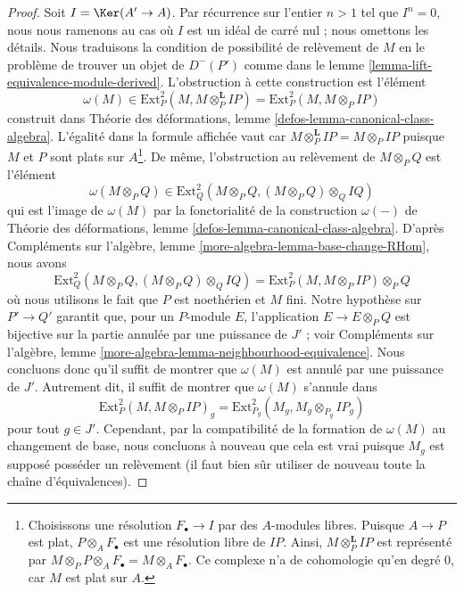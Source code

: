 \begin{proof}
Soit $I = \Ker(A' \to A)$. Par récurrence sur l'entier $n > 1$
tel que $I^n = 0$, nous nous ramenons au cas où $I$ est un idéal
de carré nul ; nous omettons les détails.
Nous traduisons la condition de possibilité de relèvement de
$M$ en le problème de trouver un objet de $D^-(P')$ comme dans le
lemme \ref{lemma-lift-equivalence-module-derived}.
L'obstruction à cette construction est l'élément
$$
\omega(M) \in \text{Ext}^2_P(M, M \otimes_P^\mathbf{L} IP) =
\text{Ext}^2_P(M, M \otimes_P IP)
$$
construit dans
Théorie des déformations, lemme \ref{defos-lemma-canonical-class-algebra}.
L'égalité dans la formule affichée vaut car
$M \otimes_P^\mathbf{L} IP = M \otimes_P IP$
puisque $M$ et $P$ sont plats sur $A$\footnote{Choisissons une résolution
$F_\bullet \to I$ par des $A$-modules libres. Puisque $A \to P$ est plat,
$P \otimes_A F_\bullet$ est une résolution libre de $IP$.
Ainsi, $M \otimes_P^\mathbf{L} IP$ est représenté par
$M \otimes_P P \otimes_A F_\bullet = M \otimes_A F_\bullet$.
Ce complexe n'a de cohomologie qu'en degré $0$, car $M$ est plat sur $A$.}.
De même, l'obstruction au relèvement de $M \otimes_P Q$ est
l'élément
$$
\omega(M \otimes_P Q) \in
\text{Ext}^2_Q(M \otimes_P Q, (M \otimes_P Q) \otimes_Q IQ)
$$
qui est l'image de $\omega(M)$ par la fonctorialité
de la construction $\omega(-)$ de
Théorie des déformations, lemme \ref{defos-lemma-canonical-class-algebra}.
D'après Compléments sur l'algèbre, lemme \ref{more-algebra-lemma-base-change-RHom},
nous avons
$$
\text{Ext}^2_Q(M \otimes_P Q, (M \otimes_P Q) \otimes_Q IQ) =
\text{Ext}^2_P(M, M \otimes_P IP) \otimes_P Q
$$
où nous utilisons le fait que $P$ est noethérien et $M$ fini.
Notre hypothèse sur $P' \to Q'$ garantit que, pour un $P$-module $E$,
l'application $E \to E \otimes_P Q$ est bijective sur la partie annulée par une puissance de $J'$ ; voir
Compléments sur l'algèbre, lemme
\ref{more-algebra-lemma-neighbourhood-equivalence}.
Nous concluons donc qu'il suffit de montrer que $\omega(M)$
est annulé par une puissance de $J'$. Autrement dit, il suffit de montrer que
$\omega(M)$ s'annule dans
$$
\text{Ext}^2_P(M, M \otimes_P IP)_g =
\text{Ext}^2_{P_g}(M_g, M_g \otimes_{P_g} IP_g)
$$
pour tout $g \in J'$. Cependant, par la compatibilité de la formation de $\omega(M)$
au changement de base, nous concluons à nouveau que cela est vrai puisque $M_g$
est supposé posséder un relèvement (il faut bien sûr utiliser de nouveau toute la
chaîne d'équivalences).
\end{proof}


